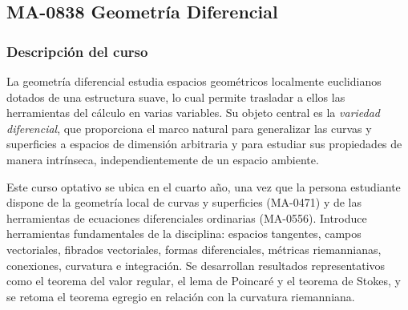 \newpage
\subsection*{MA-0838 Geometría Diferencial}

\hypertarget{MA0838}{}
\begin{refsection}
\begin{table}[H]
\end{table}

\subsubsection*{Descripción del curso}

La geometría diferencial estudia espacios geométricos localmente euclidianos dotados de una estructura suave, lo cual permite trasladar a ellos las herramientas del cálculo en varias variables. Su objeto central es la \emph{variedad diferencial}, que proporciona el marco natural para generalizar las curvas y superficies a espacios de dimensión arbitraria y para estudiar sus propiedades de manera intrínseca, independientemente de un espacio ambiente.

Este curso optativo se ubica en el cuarto año, una vez que la persona estudiante dispone de la geometría local de curvas y superficies (MA-0471) y de las herramientas de ecuaciones diferenciales ordinarias (MA-0556). Introduce herramientas fundamentales de la disciplina: espacios tangentes, campos vectoriales, fibrados vectoriales, formas diferenciales, métricas riemannianas, conexiones, curvatura e integración. Se desarrollan resultados representativos como el teorema del valor regular, el lema de Poincaré y el teorema de Stokes, y se retoma el teorema egregio en relación con la curvatura riemanniana.


\end{refsection}
